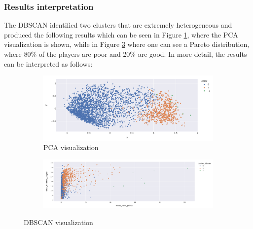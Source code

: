 \subsubsection{Results interpretation}
The DBSCAN identified two clusters that are extremely heterogeneous and produced the following results which can be seen in Figure \ref{fig:dbscan_pca}, where the PCA visualization is shown, while in Figure \ref{fig:dbscan_scatter} where one can see a Pareto distribution, where 80\% of the players are poor and 20\% are good. In more detail, the results can be interpreted as follows:
\begin{figure}[h]
	\centering
  \begin{subfigure}[b]{0.38\textwidth}
		\includegraphics[width=\textwidth]{plots/dbscan/dbscan_pca.png}
		\caption{PCA visualization}
		\label{fig:dbscan_pca}
  \end{subfigure}
  \begin{subfigure}[b]{0.48\textwidth}
		\includegraphics[width=\textwidth]{plots/dbscan/dbscan_scatter.png}
		\label{fig:dbscan_scatter}
  \end{subfigure}
	\caption{DBSCAN visualization}
\end{figure}
